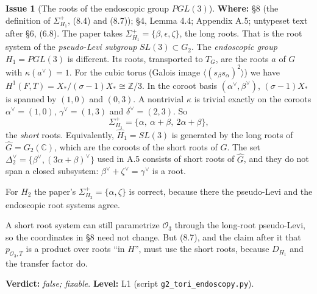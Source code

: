 \documentclass[12pt,letterpaper]{article}
\newcommand{\cO}{\mathcal{O}}
\newcommand{\Lv}[1]{\textsf{L#1}}
\newcommand{\verdict}[1]{\textbf{Verdict:} \emph{#1}.}
\newcommand{\level}[1]{\textbf{Level:} #1.}
\newcommand{\loc}[1]{\textbf{Where:} #1.}
\theoremstyle{definition}
\newtheorem{issue}{Issue}[section]
\begin{document}
\begin{issue}[The roots of the endoscopic group $PGL(3)$]\label{iss:roots}
\loc{\S8 (the definition of $\Sigma_{H_1}^+$, (8.4) and (8.7)); \S4, Lemma
4.4; Appendix A.5; untypeset text after \S6, (6.8)}
The paper takes $\Sigma_{H_1}^+=\{\beta,\epsilon,\zeta\}$, the long roots.
That is the root system of the \emph{pseudo-Levi subgroup} $SL(3)\subset G_2$.
The \emph{endoscopic group} $H_1=PGL(3)$ is different. Its roots, transported
to $T_G$, are the roots $a$ of $G$ with $\kappa(a^\vee)=1$. For the cubic
torus (Galois image $\langle(s_\beta s_\alpha)^2\rangle$) we have
$H^1(F,T)=X_*/(\sigma-1)X_*\cong\mathbb Z/3$. In the coroot basis
$(\alpha^\vee,\beta^\vee)$, $(\sigma-1)X_*$ is spanned by $(1,0)$ and $(0,3)$.
A nontrivial $\kappa$ is trivial exactly on the coroots
$\alpha^\vee=(1,0)$, $\gamma^\vee=(1,3)$ and $\delta^\vee=(2,3)$. So
\[
\Sigma_{H_1}^+=\{\alpha,\ \alpha+\beta,\ 2\alpha+\beta\},
\]
the \emph{short} roots. Equivalently, $\widehat H_1=SL(3)$ is generated by the
long roots of $\widehat G=G_2(\mathbb C)$, which are the coroots of the short
roots of $G$. The set $\Delta_2^\vee=\{\beta^\vee,(3\alpha+\beta)^\vee\}$ used
in A.5 consists of short roots of $\widehat G$, and they do not span a closed
subsystem: $\beta^\vee+\zeta^\vee=\gamma^\vee$ is a root.

For $H_2$ the paper's $\Sigma_{H_2}^+=\{\alpha,\zeta\}$ is correct, because
there the pseudo-Levi and the endoscopic root systems agree.

A short root system can still parametrize $\cO_3$ through the long-root
pseudo-Levi, so the coordinates in \S8 need not change. But (8.7), and the
claim after it that $p_{\cO_3,T}$ is a product over roots ``in $H$'', must use
the short roots, because $D_{H_1}$ and the transfer factor do.

\verdict{false; fixable}
\level{\Lv{1} (script \texttt{g2\_tori\_endoscopy.py})}
\end{issue}
\end{document}
